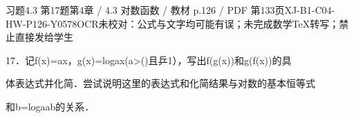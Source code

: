 \begin{bankitem}{习题4.3 第17题}{第4章 / 4.3 对数函数 / 教材 p.126 / PDF 第133页}{XJ-B1-C04-HW-P126-Y0578}{OCR未校对：公式与文字均可能有误；未完成数学TeX转写；禁止直接发给学生}
\begin{ocrdraft}
\par
17．记f(x)=ax，g(x)=logax(a>()且乒1），写出f(g(x))和g(f(x))的具
\par
体表达式并化简．尝试说明这里的表达式和化简结果与对数的基本恒等式
\par
和b=logaab的关系．
\end{ocrdraft}
\end{bankitem}
